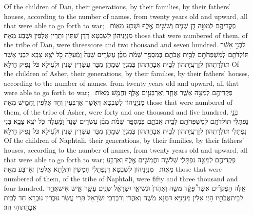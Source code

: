 {Of the children of Dan, their generations, by their families, by their fathers’ houses, according to the number of names, from twenty years old and upward, all that were able to go forth to war;}{}
{פְּקֻדֵיהֶ֖ם לְמַטֵּ֣ה דָ֑ן שְׁנַ֧יִם וְשִׁשִּׁ֛ים אֶ֖לֶף וּשְׁבַ֥ע מֵאֽוֹת׃ \petucha }
{מִנְיָנֵיהוֹן לְשִׁבְטָא דְּדָן שִׁתִּין וּתְרֵין אַלְפִין וּשְׁבַע מְאָה׃}
{those that were numbered of them, of the tribe of Dan, were threescore and two thousand and seven hundred.}{}
{לִבְנֵ֣י אָשֵׁ֔ר תּוֹלְדֹתָ֥ם לְמִשְׁפְּחֹתָ֖ם לְבֵ֣ית אֲבֹתָ֑ם בְּמִסְפַּ֣ר שֵׁמֹ֗ת מִבֶּ֨ן עֶשְׂרִ֤ים שָׁנָה֙ וָמַ֔עְלָה כֹּ֖ל יֹצֵ֥א צָבָֽא׃}
{לִבְנֵי אָשֵׁר תּוֹלְדָתְהוֹן לְזַרְעֲיָתְהוֹן לְבֵית אֲבָהָתְהוֹן בְּמִנְיַן שְׁמָהָן מִבַּר עֶשְׂרִין שְׁנִין וּלְעֵילָא כֹּל נָפֵיק חֵילָא׃}
{Of the children of Asher, their generations, by their families, by their fathers’ houses, according to the number of names, from twenty years old and upward, all that were able to go forth to war;}{}
{פְּקֻדֵיהֶ֖ם לְמַטֵּ֣ה אָשֵׁ֑ר אֶחָ֧ד וְאַרְבָּעִ֛ים אֶ֖לֶף וַחֲמֵ֥שׁ מֵאֽוֹת׃ \petucha }
{מִנְיָנֵיהוֹן לְשִׁבְטָא דְּאָשֵׁר אַרְבְּעִין וְחַד אַלְפִין וַחֲמֵישׁ מְאָה׃}
{those that were numbered of them, of the tribe of Asher, were forty and one thousand and five hundred.}{}
{בְּנֵ֣י נַפְתָּלִ֔י תּוֹלְדֹתָ֥ם לְמִשְׁפְּחֹתָ֖ם לְבֵ֣ית אֲבֹתָ֑ם בְּמִסְפַּ֣ר שֵׁמֹ֗ת מִבֶּ֨ן עֶשְׂרִ֤ים שָׁנָה֙ וָמַ֔עְלָה כֹּ֖ל יֹצֵ֥א צָבָֽא׃}
{בְּנֵי נַפְתָּלִי תּוֹלְדָתְהוֹן לְזַרְעֲיָתְהוֹן לְבֵית אֲבָהָתְהוֹן בְּמִנְיַן שְׁמָהָן מִבַּר עֶשְׂרִין שְׁנִין וּלְעֵילָא כֹּל נָפֵיק חֵילָא׃}
{Of the children of Naphtali, their generations, by their families, by their fathers’ houses, according to the number of names, from twenty years old and upward, all that were able to go forth to war;}{}
{פְּקֻדֵיהֶ֖ם לְמַטֵּ֣ה נַפְתָּלִ֑י שְׁלֹשָׁ֧ה וַחֲמִשִּׁ֛ים אֶ֖לֶף וְאַרְבַּ֥ע מֵאֽוֹת׃ \petucha }
{מִנְיָנֵיהוֹן לְשִׁבְטָא דְּנַפְתָּלִי חַמְשִׁין וּתְלָתָא אַלְפִין וְאַרְבַּע מְאָה׃}
{those that were numbered of them, of the tribe of Naphtali, were fifty and three thousand and four hundred.}{}
{אֵ֣לֶּה הַפְּקֻדִ֡ים אֲשֶׁר֩ פָּקַ֨ד מֹשֶׁ֤ה וְאַהֲרֹן֙ וּנְשִׂיאֵ֣י יִשְׂרָאֵ֔ל שְׁנֵ֥ים עָשָׂ֖ר אִ֑ישׁ אִישׁ\maqqaf אֶחָ֥ד לְבֵית\maqqaf אֲבֹתָ֖יו הָיֽוּ׃}
{אִלֵּין מִנְיָנַיָּא דִּמְנָא מֹשֶׁה וְאַהֲרֹן וְרַבְרְבֵי יִשְׂרָאֵל תְּרֵי עֲשַׂר גּוּבְרִין גּוּבְרָא חַד לְבֵית אֲבָהָתוֹהִי הֲווֹ׃}
